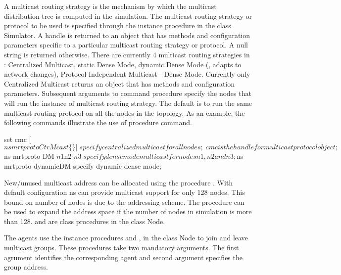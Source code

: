 A multicast routing strategy is the mechanism by which the multicast
distribution tree is computed in the simulation.  The multicast
routing strategy or protocol to be used is specified through the
instance procedure  in the class Simulator.
A handle is returned to an object that has methods
and configuration parameters specific to a particular multicast
routing strategy or protocol.  A null string is returned otherwise.
There are currently 4 multicast routing strategies in \ns: Centralized
Multicast, static Dense Mode, dynamic Dense Mode (\ie, adapts to
network changes), Protocol Independent Multicast---Dense Mode.
Currently only Centralized Multicast returns an object that has
methods and configuration parameters. Subsequent arguments to command
procedure  specify the nodes that will run the
instance of multicast routing strategy.
The default is to run the same multicast routing
protocol on all the nodes in the topology. As an example, the
following commands illustrate the use of procedure  command.
\begin{program}
	set cmc [$ns mrtproto CtrMcast \{\}]	\; specify centralized multicast for all nodes;
	\; cmc is the handle for multicast protocol object;
	$ns mrtproto DM $n1 $n2 $n3		\; specify dense mode multicast for nodes n1, n2 and n3;
	$ns mrtproto dynamicDM 			\; specify dynamic dense mode;
\end{program}

New/unused multicast address can be allocated using the procedure
. With default configuration ns can provide multicast
support for only 128 nodes. This bound on number of nodes is due to
the addressing scheme. The procedure  can be used to
expand the address space if the number of nodes in simulation is more
than 128.  and  are class
procedures in the class Node.

The agents use the instance procedures
 and , in
the class Node to join and leave multicast groups. These procedures
take two mandatory arguments. The first agrument identifies the
corresponding agent and second argument specifies the group address.

